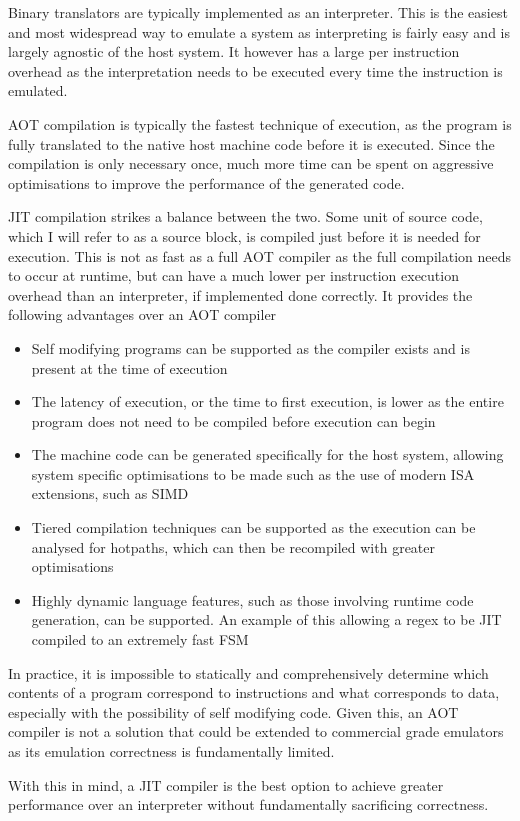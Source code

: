 Binary translators are typically implemented as an interpreter. This is the easiest and most widespread way to emulate a system as interpreting is fairly easy and is largely agnostic of the host system. It however has a large per instruction overhead as the interpretation needs to be executed every time the instruction is emulated.

AOT compilation is typically the fastest technique of execution, as the program is fully translated to the native host machine code before it is executed. Since the compilation is only necessary once, much more time can be spent on aggressive optimisations to improve the performance of the generated code.

JIT compilation strikes a balance between the two. Some unit of source code, which I will refer to as a source block, is compiled just before it is needed for execution. This is not as fast as a full AOT compiler as the full compilation needs to occur at runtime, but can have a much lower per instruction execution overhead than an interpreter, if implemented done correctly. It provides the following advantages over an AOT compiler

\begin{itemize}
	\item Self modifying programs can be supported as the compiler exists and is present at the time of execution
	\item The latency of execution, or the time to first execution, is lower as the entire program does not need to be compiled before execution can begin
	\item The machine code can be generated specifically for the host system, allowing system specific optimisations to be made such as the use of modern ISA extensions, such as SIMD
	\item Tiered compilation techniques can be supported as the execution can be analysed for hotpaths, which can then be recompiled with greater optimisations
	\item Highly dynamic language features, such as those involving runtime code generation, can be supported. An example of this allowing a regex to be JIT compiled to an extremely fast FSM
\end{itemize}

In practice, it is impossible to statically and comprehensively determine which contents of a program correspond to instructions and what corresponds to data, especially with the possibility of self modifying code. Given this, an AOT compiler is not a solution that could be extended to commercial grade emulators as its emulation correctness is fundamentally limited.

With this in mind, a JIT compiler is the best option to achieve greater performance over an interpreter without fundamentally sacrificing correctness.